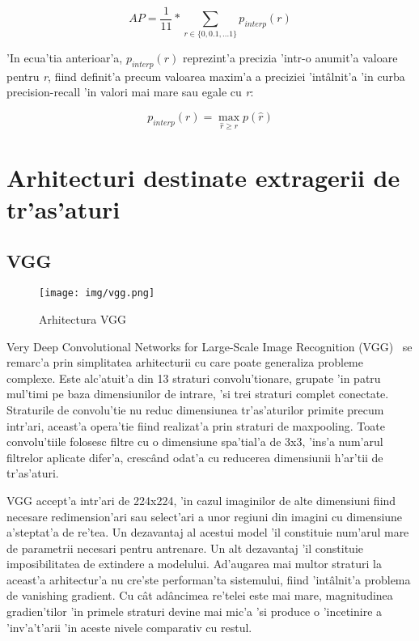 \documentclass[12pt,a4paper,twoside]{report}
\begin{document}
\begin{equation}
AP = \frac{1}{11} *\sum\limits_{r \in \{0, 0.1, ...1\}} p_{interp}(r)
\end{equation}

'In ecua'tia anterioar'a, \textit{$p_{interp}(r)$} reprezint'a precizia 'intr-o anumit'a valoare pentru \textit{r}, fiind definit'a precum valoarea maxim'a a preciziei 'int\^alnit'a 'in curba precision-recall 'in valori mai mare sau egale cu \textit{r}:

\begin{equation}
p_{interp}(r) = \max\limits_{\hat{r} \geq r} p(\hat{r})
\end{equation}

\section{Arhitecturi destinate extragerii de tr'as'aturi}
\subsection{VGG}
\begin{figure}[H]
  \texttt{[image: img/vgg.png]}
  \centering
  \caption{Arhitectura VGG\protect\footnotemark}
\end{figure}

Very Deep Convolutional Networks for Large-Scale Image Recognition (VGG)~\cite{VGG} se remarc'a prin simplitatea arhitecturii cu care poate generaliza probleme complexe. Este alc'atuit'a din 13 straturi convolu'tionare, grupate 'in patru mul'timi pe baza dimensiunilor de intrare, 'si trei straturi complet conectate. Straturile de convolu'tie nu reduc dimensiunea tr'as'aturilor primite precum intr'ari, aceast'a opera'tie fiind realizat'a prin straturi de maxpooling. Toate convolu'tiile folosesc filtre cu o dimensiune spa'tial'a de 3x3, 'ins'a num'arul filtrelor aplicate difer'a, cresc\^and odat'a cu reducerea dimensiunii h'ar'tii de tr'as'aturi.

VGG accept'a intr'ari de 224x224, 'in cazul imaginilor de alte dimensiuni fiind necesare redimension'ari sau select'ari a unor regiuni din imagini cu dimensiune a'steptat'a de re'tea. Un dezavantaj al acestui model 'il constituie num'arul mare de parametrii necesari pentru antrenare. Un alt dezavantaj 'il constituie imposibilitatea de extindere a modelului. Ad'augarea mai multor straturi la aceast'a arhitectur'a nu cre'ste performan'ta sistemului, fiind 'int\^alnit'a problema de vanishing gradient. Cu c\^at ad\^ancimea re'telei este mai mare, magnitudinea gradien'tilor 'in primele straturi devine mai mic'a 'si produce o 'incetinire a 'inv'a't'arii 'in aceste nivele comparativ cu restul.
\end{document}

